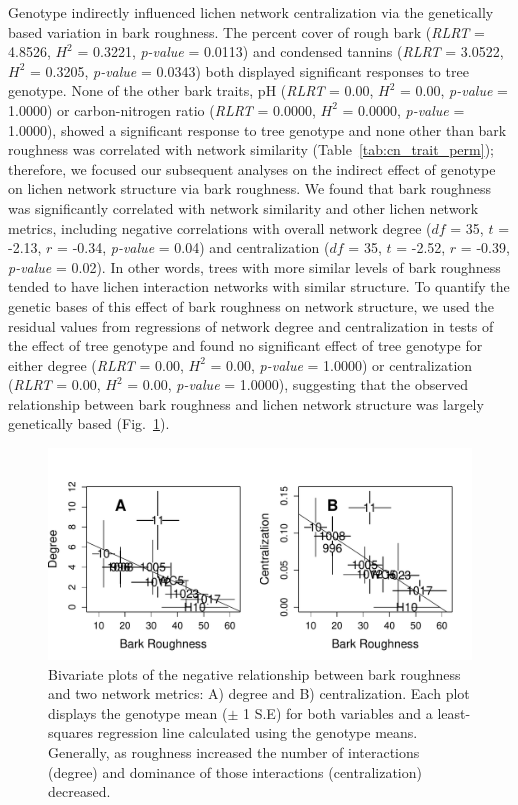 \documentclass[fleqn,12pt]{olplainarticle}
\begin{document}
Genotype indirectly influenced lichen network centralization via the
genetically based variation in bark roughness. The percent cover of
rough bark (\textit{RLRT} = 4.8526, $H^2$ = 0.3221, \textit{p-value} =
0.0113) and condensed tannins (\textit{RLRT} = 3.0522, $H^2$ = 0.3205,
\textit{p-value} = 0.0343) both displayed significant responses to
tree genotype. None of the other bark traits, pH (\textit{RLRT} =
0.00, $H^2$ = 0.00, \textit{p-value} = 1.0000) or carbon-nitrogen
ratio (\textit{RLRT} = 0.0000, $H^2$ = 0.0000, \textit{p-value} =
1.0000), showed a significant response to tree genotype and none other
than bark roughness was correlated with network similarity
(Table~\ref{tab:cn_trait_perm}); therefore, we focused our subsequent
analyses on the indirect effect of genotype on lichen network
structure via bark roughness. We found that bark roughness was
significantly correlated with network similarity and other lichen
network metrics, including negative correlations with overall network
degree ($df$ = 35, $t$ = -2.13, $r$ = -0.34, \textit{p-value} = 0.04)
and centralization ($df$ = 35, $t$ = -2.52, $r$ = -0.39,
\textit{p-value} = 0.02). In other words, trees with more similar
levels of bark roughness tended to have lichen interaction networks
with similar structure. To quantify the genetic bases of this effect
of bark roughness on network structure, we used the residual values
from regressions of network degree and centralization in tests of the
effect of tree genotype and found no significant effect of tree
genotype for either degree (\textit{RLRT} = 0.00, $H^2$ = 0.00,
\textit{p-value} = 1.0000) or centralization (\textit{RLRT} = 0.00,
$H^2$ = 0.00, \textit{p-value} = 1.0000), suggesting that the observed
relationship between bark roughness and lichen network structure was
largely genetically based (Fig.~\ref{fig:br_net}).



\begin{figure}[ht]
\centering
\includegraphics[width=\linewidth]{figures/br_net.pdf}
\caption{Bivariate plots of the negative relationship between bark
  roughness and two network metrics: A) degree and B)
  centralization. Each plot displays the genotype mean ($\pm$ 1 S.E)
  for both variables and a least-squares regression line calculated
  using the genotype means. Generally, as roughness increased the
  number of interactions (degree) and dominance of
  those interactions (centralization) decreased.}
\label{fig:br_net}
\end{figure}
\end{document}
